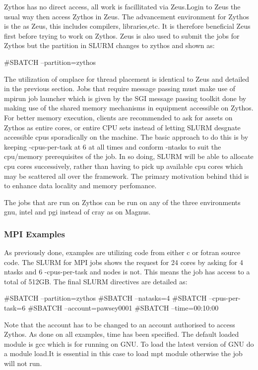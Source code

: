 \documentclass[journal]{IEEEtran}
\begin{document}
Zythos has no direct access, all work is facillitated via Zeus.Login to Zeus the usual way then access Zythos in Zeus.
The advancement environment for Zythos is the as Zeus, this includes compilers, libraries,etc. 
It is therefore beneficial Zeus first before trying to work on Zythos.
Zeus is also used to submit the jobs for Zythos but the partition in SLURM changes to zythos and shown as:

#SBATCH --partition=zythos

The utilization of omplace for thread placement is identical to Zeus and detailed in the previous section.
Jobs that require message passing must make use of mpirun job launcher which is given by the SGI message passing toolkit done by making use of the shared memory mechanisms in equipment accessible on Zythos.
For better memory execution, clients are recommended to ask for assets on Zythos as entire cores, or entire CPU sets instead of letting SLURM desgnate accessible cpus sporadically on the machine. 
The basic approach to do this is by keeping -cpus-per-task at 6 at all times and conform -ntasks to suit the cpu/memory prerequisites of the job.
In so doing, SLURM will be able to allocate cpu cores successively, rather than having to pick up available cpu cores which may be scattered all over the framework.
The primary motivation behind thid is to enhance data locality and memory perfomance.

The jobs that are run on Zythos can be run on any of the three environments gnu, intel and pgi instead of cray as on Magnus.



\subsubsection{MPI Examples}

As previously done, examples are utilizing code from either c or fotran source code.
The SLURM for MPI jobs shows the request for 24 cores by asking for 4 ntasks and 6 -cpus-per-task and nodes is not. 
This means the job has access to a total of 512GB.
The final SLURM directives are detailed as:

#SBATCH --partition=zythos
#SBATCH --natasks=4
#SBATCH --cpus-per-task=6
#SBATCH --account=pawsey0001
#SBATCH --time=00:10:00

Note that the account has to be changed to an account authorised to access Zythos.
As done on all examples, time has been specified.
The default loaded module is gcc which is for running on GNU.
To load the latest version of GNU do a module load.It is essential in this case to load mpt module otherwise the job will not run.
\end{document}
